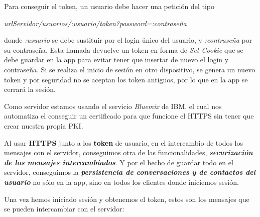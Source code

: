 \documentclass[]{article}
\begin{document}
Para conseguir el token, un usuario debe hacer una petición del tipo

 \textit{urlServidor/usuarios/:usuario/token?password=:contraseña}
 
  donde \textit{:usuario} se debe sustituir por el login único del usuario, y \textit{:contraseña} por su contraseña. Esta llamada devuelve un token en forma de \textit{Set-Cookie} que se debe guardar en la app para evitar tener que insertar de nuevo el login y contraseña. Si se realiza el inicio de sesión en otro dispositivo, se genera un nuevo token y por seguridad no se aceptan los token antiguos, por lo que en la app se cerrará la sesión.

\hfill

Como servidor estamos usando el servicio \textit{Bluemix} de IBM, el cual nos automatiza el conseguir un certificado para que funcione el HTTPS sin tener que crear nuestra propia PKI.

\hfill

Al usar \textbf{HTTPS} junto a los \textbf{token} de usuario, en el intercambio de todos los mensajes con el servidor, conseguimos otra de las funcionalidades, \textbf{\textit{securización de los mensajes intercambiados}}. Y por el hecho de guardar todo en el servidor, conseguimos la \textbf{\textit{persistencia de conversaciones y de contactos del usuario}} no sólo en la app, sino en todos los clientes donde iniciemos sesión.

\hfill

Una vez hemos iniciado sesión y obtenemos el token, estos son los mensajes que se pueden intercambiar con el servidor:
\end{document}
